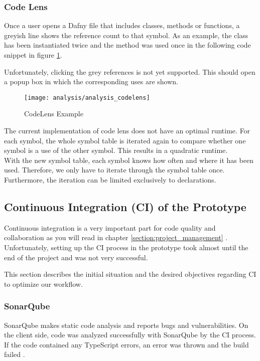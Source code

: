 \subsubsection{Code Lens}
Once a user opens a Dafny file that includes classes, methods or functions, a greyish line shows the reference count to that symbol.
As an example, the class  has been instantiated twice and the method  was used once in the following code snippet in figure \ref{fig:analysis_codelens}.

Unfortunately, clicking the grey references is not yet supported.
This should open a popup box in which the corresponding uses are shown.

\begin{figure}[H]
    \centering
    \texttt{[image: analysis/analysis\_codelens]}
    \caption{CodeLens Example}
    \label{fig:analysis_codelens}
\end{figure}

The current implementation of code lens does not have an optimal runtime.
For each symbol, the whole symbol table is iterated again to compare whether one symbol is a use of the other symbol.
This results in a quadratic runtime. \\

With the new symbol table, each symbol knows how often and where it has been used.
Therefore, we only have to iterate through the symbol table once.
Furthermore, the iteration can be limited exclusively to declarations.




\subsection{Continuous Integration (CI) of the Prototype}
\label{section:analysis:CI}

Continuous integration is a very important part for code quality and collaboration
as you will read in chapter \ref{section:project_management} .
Unfortunately, setting up the CI process in the prototype took almost until the end of the project
and was not very successful.

This section describes the initial situation and the desired objectives regarding CI to optimize our workflow.

\subsubsection{SonarQube}
SonarQube makes static code analysis and reports bugs and vulnerabilities.
On the client side, code was analyzed successfully with SonarQube by the CI process.
If the code contained any TypeScript errors, an error was thrown and the build failed \cite{sa}.\\


